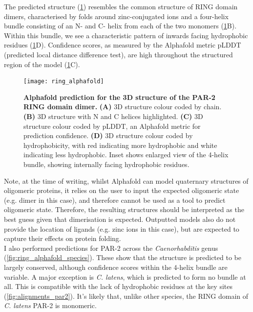 \documentclass[12pt]{"article"}
\newcommand{\mycaption}[2]{\caption[#1]{\textbf{#1.} #2}}
\begin{document}
The predicted structure (\cref{fig:ring_alphafold}) resembles the common structure of RING domain dimers, characterised by folds around zinc-conjugated ions and a four-helix bundle consisting of an N- and C- helix from each of the two monomers (\cref{fig:ring_alphafold}B). Within this bundle, we see a characteristic pattern of inwards facing hydrophobic residues (\cref{fig:ring_alphafold}D). Confidence scores, as measured by the Alphafold metric pLDDT (predicted local distance difference test), are high throughout the structured region of the model (\cref{fig:ring_alphafold}C).\\


\begin{figure}
\texttt{[image: ring\_alphafold]}
\centering
\mycaption{Alphafold prediction for the 3D structure of the PAR-2 RING domain dimer}{
\textbf{(A)} 3D structure colour coded by chain.
\textbf{(B)} 3D structure with N and C helices highlighted.
\textbf{(C)} 3D structure colour coded by pLDDT, an Alphafold metric for prediction confidence.
\textbf{(D)} 3D structure colour coded by hydrophobicity, with red indicating more hydrophobic and white indicating less hydrophobic. Inset shows enlarged view of the 4-helix bundle, showing internally facing hydrophobic residues.
}
\label{fig:ring_alphafold}
\end{figure}

Note, at the time of writing, whilst Alphafold can model quaternary structures of oligomeric proteins, it relies on the user to input the expected oligomeric state (e.g. dimer in this case), and therefore cannot be used as a tool to predict oligomeric state. Therefore, the resulting structures should be interpreted as the best guess given that dimerisation is expected. Outputted models also do not provide the location of ligands (e.g. zinc ions in this case), but are expected to capture their effects on protein folding.\\

I also performed predictions for PAR-2 across the \textit{Caenorhabditis} genus (\cref{fig:ring_alphafold_species}). These show that the structure is predicted to be largely conserved, although confidence scores within the 4-helix bundle are variable. A major exception is \textit{C. latens}, which is predicted to form no bundle at all. This is compatible with the lack of hydrophobic residues at the key sites (\cref{fig:alignments_par2}). It's likely that, unlike other species, the RING domain of \textit{C. latens} PAR-2 is monomeric.\\
\end{document}
